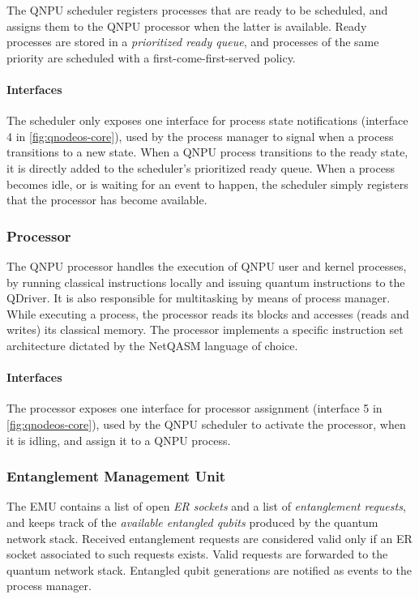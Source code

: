 The \ac{QNPU} scheduler registers processes that are ready to be scheduled, and assigns them to the \ac{QNPU} processor when the latter is available. Ready processes are stored in a \emph{prioritized ready queue}, and processes of the same priority are scheduled with a first-come-first-served policy.

\paragraph{Interfaces}

The scheduler only exposes one interface for process state notifications (interface 4 in \cref{fig:qnodeos-core}), used by the process manager to signal when a process transitions to a new state. When a \ac{QNPU} process transitions to the ready state, it is directly added to the scheduler's prioritized ready queue. When a process becomes idle, or is waiting for an event to happen, the scheduler simply registers that the processor has become available.

\subsubsection{Processor}

The \ac{QNPU} processor handles the execution of \ac{QNPU} user and kernel processes, by running classical instructions locally and issuing quantum instructions to the \ac{QDriver}. It is also responsible for multitasking by means of process manager. While executing a process, the processor reads its blocks and accesses (reads and writes) its classical memory. The processor implements a specific instruction set architecture dictated by the \ac{NetQASM} language of choice.

\paragraph{Interfaces}

The processor exposes one interface for processor assignment (interface 5 in \cref{fig:qnodeos-core}), used by the \ac{QNPU} scheduler to activate the processor, when it is idling, and assign it to a \ac{QNPU} process.

\subsubsection{Entanglement Management Unit}

The \acf{EMU} contains a list of open \emph{\ac{ER} sockets} and a list of \emph{entanglement requests}, and keeps track of the \emph{available entangled qubits} produced by the quantum network stack. Received entanglement requests are considered valid only if an \ac{ER} socket associated to such requests exists. Valid requests are forwarded to the quantum network stack. Entangled qubit generations are notified as events to the process manager.

